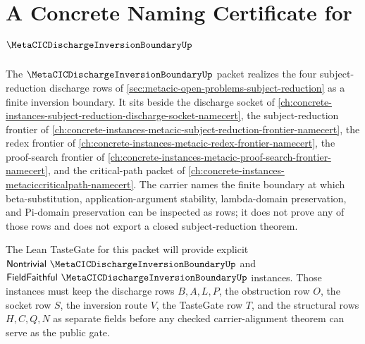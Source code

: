 \chapter{A Concrete Naming Certificate for $\MetaCICDischargeInversionBoundaryUp$}
\label{ch:concrete-instances-metacic-discharge-inversion-boundary-namecert}

The $\MetaCICDischargeInversionBoundaryUp$ packet realizes the four subject-reduction discharge rows of \autoref{sec:metacic-open-problems-subject-reduction} as a finite inversion boundary. It sits beside the discharge socket of \autoref{ch:concrete-instances-subject-reduction-discharge-socket-namecert}, the subject-reduction frontier of \autoref{ch:concrete-instances-metacic-subject-reduction-frontier-namecert}, the redex frontier of \autoref{ch:concrete-instances-metacic-redex-frontier-namecert}, the proof-search frontier of \autoref{ch:concrete-instances-metacic-proof-search-frontier-namecert}, and the critical-path packet of \autoref{ch:concrete-instances-metaciccriticalpath-namecert}. The carrier names the finite boundary at which beta-substitution, application-argument stability, lambda-domain preservation, and Pi-domain preservation can be inspected as rows; it does not prove any of those rows and does not export a closed subject-reduction theorem.



The Lean TasteGate for this packet will provide explicit $\mathsf{Nontrivial}\ \MetaCICDischargeInversionBoundaryUp$ and $\mathsf{FieldFaithful}\ \MetaCICDischargeInversionBoundaryUp$ instances. Those instances must keep the discharge rows $B,A,L,P$, the obstruction row $O$, the socket row $S$, the inversion route $V$, the TasteGate row $T$, and the structural rows $H,C,Q,N$ as separate fields before any checked carrier-alignment theorem can serve as the public gate.

